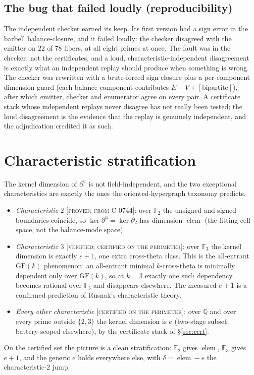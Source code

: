 \documentclass[11pt,reqno]{amsart}
\theoremstyle{plain}
\theoremstyle{definition}
\theoremstyle{plain}
\theoremstyle{definition}
\newcommand{\elem}{\operatorname{elem}}
\newcommand{\Q}{\mathbb{Q}}
\newcommand{\F}{\mathbb{F}}
\newcommand{\dbu}{\partial^{u}}
\newcommand{\dd}{\delta}
\newcommand{\st}{\textsc}
\begin{document}
\subsection{The bug that failed loudly (reproducibility)}
The independent checker earned its keep. Its first version had a sign error in the barbell
balance-closure, and it failed loudly: the checker disagreed with the emitter on $22$ of $78$
fibers, at all eight primes at once. The fault was in the checker, not the certificates, and a
loud, characteristic-independent disagreement is exactly what an independent replay should
produce when something is wrong. The checker was rewritten with a brute-forced sign closure plus
a per-component dimension guard (each balance component contributes $E-V+[\text{bipartite}]$),
after which emitter, checker and enumerator agree on every pair. A certificate stack whose
independent replays never disagree has not really been tested; the loud disagreement is the
evidence that the replay is genuinely independent, and the adjudication credited it as such.

\section{Characteristic stratification}\label{sec:strat}

The kernel dimension of $\dbu$ is not field-independent, and the two exceptional characteristics
are exactly the ones the oriented-hypergraph taxonomy predicts.
\begin{itemize}
\item \emph{Characteristic $2$} \st{[proved; from C-0744]}: over $\F_2$ the unsigned and signed
boundaries coincide, so $\ker\dbu=\ker\partial_2$ has dimension $\elem$ (the fitting-cell space,
not the balance-mode space).
\item \emph{Characteristic $3$} \st{[verified; certified on the perimeter]}: over $\F_3$ the
kernel dimension is exactly $e+1$, one extra cross-theta class. This is the all-entrant
$\mathrm{GF}(k)$ phenomenon: an all-entrant minimal $k$-cross-theta is minimally dependent only
over $\mathrm{GF}(k)$, so at $k=3$ exactly one such dependency becomes rational over $\F_3$ and
disappears elsewhere. The measured $e+1$ is a confirmed prediction of Rusnak's characteristic
theory.
\item \emph{Every other characteristic} \st{[certified on the perimeter]}: over $\Q$ and over
every prime outside $\{2,3\}$ the kernel dimension is $e$ (two-stage subset; battery-scoped
elsewhere), by the certificate stack of \S\ref{sec:cert}.
\end{itemize}
On the certified set the picture is a clean stratification: $\F_2$ gives $\elem$, $\F_3$ gives
$e+1$, and the generic $e$ holds everywhere else, with $\dd=\elem-e$ the characteristic-$2$ jump.
\end{document}
